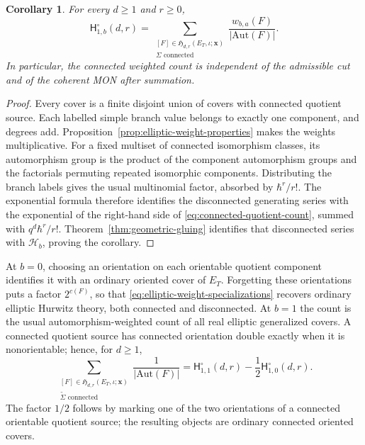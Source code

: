 \documentclass[11pt,a4paper,reqno]{article}
\newtheorem{corollary}[theorem]{Corollary}
\theoremstyle{definition}
\theoremstyle{remark}
\newcommand\Hb{{\mathsf H}}
\newcommand\Aut{{\mathrm{Aut}}}
\begin{document}
\begin{corollary}\label{cor:connected-quotient-covers}
For every $d\geq1$ and $r\geq0$,
\begin{equation}\label{eq:connected-quotient-count}
\Hb^\circ_{1,b}(d,r)
=\sum_{\substack{[F]\in\mathfrak H_{d,r}(E_T,\iota;\mathbf x)\\
\Sigma\text{ connected}}}\frac{w_{b,a}(F)}{|\Aut(F)|}.
\end{equation}
In particular, the connected weighted count is independent of the admissible cut and of the coherent MON after summation.
\end{corollary}

\begin{proof}
Every cover is a finite disjoint union of covers with connected quotient source.  Each labelled simple branch value belongs to exactly one component, and degrees add.  Proposition~\ref{prop:elliptic-weight-properties} makes the weights multiplicative.  For a fixed multiset of connected isomorphism classes, its automorphism group is the product of the component automorphism groups and the factorials permuting repeated isomorphic components.  Distributing the branch labels gives the usual multinomial factor, absorbed by $\hbar^r/r!$.  The exponential formula therefore identifies the disconnected generating series with the exponential of the right-hand side of \eqref{eq:connected-quotient-count}, summed with $q^d\hbar^r/r!$.  Theorem~\ref{thm:geometric-gluing} identifies that disconnected series with $\mathscr H_b$, proving the corollary.
\end{proof}

At $b=0$, choosing an orientation on each orientable quotient component identifies it with an ordinary oriented cover of $E_T$.  Forgetting these orientations puts a factor $2^{c(F)}$, so that \eqref{eq:elliptic-weight-specializations} recovers ordinary elliptic Hurwitz theory, both connected and disconnected.  At $b=1$ the count is the usual automorphism-weighted count of all real elliptic generalized covers.  A connected quotient source has connected orientation double exactly when it is nonorientable; hence, for $d\geq1$,
\begin{equation}\label{eq:connected-orientation-double-count}
\sum_{\substack{[F]\in\mathfrak H_{d,r}(E_T,\iota;\mathbf x)\\
\widetilde\Sigma\text{ connected}}}\frac1{|\Aut(F)|}
=\Hb^\circ_{1,1}(d,r)-\frac12\Hb^\circ_{1,0}(d,r).
\end{equation}
The factor $1/2$ follows by marking one of the two orientations of a connected orientable quotient source; the resulting objects are ordinary connected oriented covers.
\end{document}
